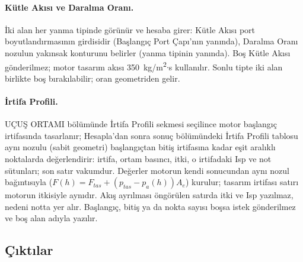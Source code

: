 \documentclass[11pt,a4paper]{article}
\newcommand{\ui}[1]{\textsf{#1}}
\begin{document}
\paragraph{Kütle Akısı ve Daralma Oranı.} İki alan her yanma tipinde görünür
ve hesaba girer: \ui{Kütle Akısı} port boyutlandırmasının girdisidir
(\ui{Başlangıç Port Çapı}'nın yanında), \ui{Daralma Oranı} nozulun yakınsak
konturunu belirler (yanma tipinin yanında). Boş \ui{Kütle Akısı} gönderilmez;
motor tasarım akısı 350~kg/m\textsuperscript{2}$\cdot$s kullanılır. Sonlu
tipte iki alan birlikte boş bırakılabilir; oran geometriden gelir.

\paragraph{İrtifa Profili.} \ui{UÇUŞ ORTAMI} bölümünde \ui{İrtifa Profili} sekmesi seçilince
motor başlangıç irtifasında tasarlanır; Hesapla'dan sonra sonuç bölümündeki
\ui{İrtifa Profili} tablosu aynı nozulu (sabit geometri) başlangıçtan bitiş
irtifasına kadar eşit aralıklı noktalarda değerlendirir: irtifa, ortam
basıncı, itki, o irtifadaki Isp ve not sütunları; son satır vakumdur.
Değerler motorun kendi sonucundan aynı nozul bağıntısıyla
($F(h) = F_{tas} + (p_{tas} - p_a(h))A_e$) kurulur; tasarım irtifası satırı
motorun itkisiyle aynıdır. Akış ayrılması öngörülen satırda itki ve Isp
yazılmaz, nedeni notta yer alır. Başlangıç, bitiş ya da nokta sayısı boşsa
istek gönderilmez ve boş alan adıyla yazılır.

\subsection{Çıktılar}
\end{document}
